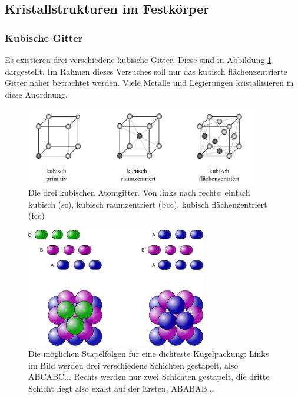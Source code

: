 \subsection{Kristallstrukturen im Festkörper}
\subsubsection{Kubische Gitter}


Es existieren drei verschiedene kubische Gitter.
Diese sind in Abbildung \ref{kub} dargestellt. Im Rahmen dieses Versuches
soll nur das kubisch flächenzentrierte Gitter näher betrachtet werden. Viele Metalle
und Legierungen kristallisieren in diese Anordnung.\\

\begin{figure}[H]
	\centering
	\includegraphics[width=0.9\textwidth]{Abb/kubische_gitter.png}
	\caption{Die drei kubischen Atomgitter. Von links nach rechts: 
		einfach kubisch (sc), kubisch raumzentriert (bcc),
		kubisch flächenzentriert (fcc) \cite{hunklinger}}
	\label{kub}
\end{figure}
\begin{figure}
	\centering
	\includegraphics[width=0.7\textwidth]{Abb/DichtesteKugelpackung.pdf}
	\caption{Die möglichen Stapelfolgen für eine dichteste Kugelpackung:
		Links im Bild werden drei verschiedene Schichten gestapelt,
		also ABCABC... 
		Rechts werden nur zwei Schichten gestapelt, die dritte Schicht liegt
		also exakt auf der Ersten, ABABAB... \cite{kugel}}
	\label{pack}
\end{figure}
